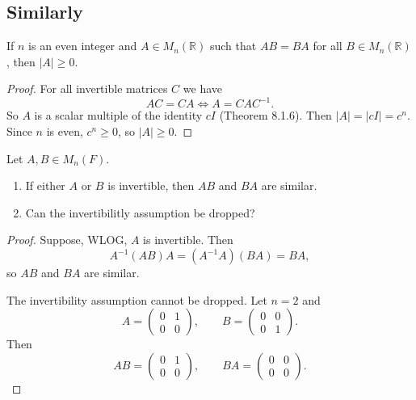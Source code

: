 \subsection{Similarly}

\newpage
\begin{tcolorbox}[title=Problem 1, breakable]
    If $n$ is an even integer and $A \in M_n(\mathbb{R})$
        such that $AB = BA$ for all $B \in M_n(\mathbb{R})$, 
        then $|A| \ge 0$.
\end{tcolorbox}

\begin{proof}
    For all invertible matrices $C$ we have 
    \[AC = CA \iff A = CAC^{-1}.\]
    So $A$ is a scalar multiple of the identity $cI$ (Theorem 8.1.6).
    Then $|A| = |cI| = c^n$.
    Since $n$ is even, $c^n \ge 0$, so $|A| \ge 0$.
\end{proof}

\begin{tcolorbox}[title=Problem 2, breakable]
    Let $A, B \in M_n(F)$.
    \begin{enumerate}
        \item If either $A$ or $B$ is invertible, then $AB$ and $BA$ are similar.
        \item Can the invertibilitly assumption be dropped?
    \end{enumerate}
\end{tcolorbox}

\begin{proof}
    Suppose, WLOG, $A$ is invertible.
    Then
    \[A^{-1}(AB)A = (A^{-1}A)(BA) = BA,\]
    so $AB$ and $BA$ are similar.

    The invertibility assumption cannot be dropped.
    Let $n = 2$ and
    \[A = \begin{pmatrix} 0 & 1 \\ 0 & 0 \end{pmatrix}, \qquad
      B = \begin{pmatrix} 0 & 0 \\ 0 & 1 \end{pmatrix}.\]
    Then
    \[AB = \begin{pmatrix} 0 & 1 \\ 0 & 0 \end{pmatrix}, \qquad
      BA = \begin{pmatrix} 0 & 0 \\ 0 & 0 \end{pmatrix}.\]
\end{proof}

